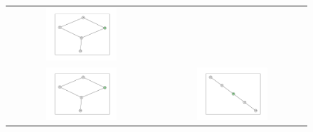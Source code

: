 \documentclass[12pt, a4paper]{extarticle}
\begin{document}
\begin{figure}
\begin{tabularx}{\textwidth}{cc}
\includegraphics[width=0.5\textwidth]{task11-graphlets/5_14-21-22-23-24.pdf} \\
\includegraphics[width=0.5\textwidth]{task11-graphlets/5_21-20-22-23-24.pdf} &
\includegraphics[width=0.5\textwidth]{task11-graphlets/5_21-18-20-19-23.pdf} \\
\end{tabularx}\end{figure}
\end{document}
